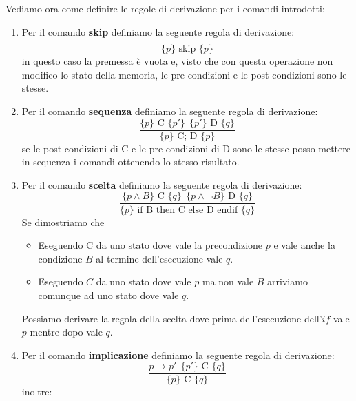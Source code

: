 Vediamo ora come definire le regole di derivazione per i comandi introdotti:
\begin{enumerate}
    \item Per il comando \textbf{skip} definiamo la seguente regola di derivazione:
          \begin{equation}
              \frac{}{\{p\} \text{ skip } \{p\}}
          \end{equation}
          in questo caso la premessa è vuota e, visto che con questa operazione
          non modifico lo stato della memoria, le pre-condizioni e le post-condizioni
          sono le stesse.
    \item Per il comando \textbf{sequenza} definiamo la seguente regola di derivazione:
          \begin{equation}
              \frac{\{p\} \text{ C } \{p'\} \ \ \{p'\} \text{ D } \{q\}}{\{p\} \text{ C; D } \{p\}}
          \end{equation}
          se le post-condizioni di C  e le pre-condizioni di D sono le stesse
          posso mettere in sequenza i comandi ottenendo lo stesso risultato.
    \item Per il comando \textbf{scelta} definiamo la seguente regola di derivazione:
          \begin{equation}
              \frac{\{p \land B\} \text{ C } \{q\} \ \ \{p \land \lnot B\} \text{ D } \{q\}}{\{p\} \text{ if B then C else D endif } \{q\}}
          \end{equation}
          Se dimostriamo che
          \begin{itemize}
              \item Eseguendo C da uno stato dove vale la precondizione $p$ e
                    vale anche la condizione $B$ al termine dell'esecuzione vale $q$.
              \item Eseguendo $C$ da uno stato dove vale $p$ ma non vale $B$
                    arriviamo comunque ad uno stato dove vale $q$.
          \end{itemize}
          Possiamo derivare la regola della scelta dove prima dell'esecuzione
          dell'$if$ vale $p$ mentre dopo vale $q$.
    \item Per il comando \textbf{implicazione} definiamo la seguente regola di
          derivazione:
          \begin{equation}
              \frac{p \to p' \ \ \{p'\} \text{ C } \{q\}}{\{p\} \text{ C } \{q\}}
          \end{equation}
          inoltre:
          \begin{equation}

\end{equation}
\end{enumerate}
